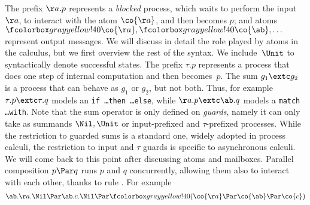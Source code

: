 The prefix $ \aa.p $ represents a {\em blocked} process, which waits
to perform the
input $\aa$, \ie to interact with the atom $\co{ \aa}$, and then becomes $p$; and atoms
$\mailbox{\co{ \aa }}, \mailbox{\co{ \ab }}, \ldots$ represent output
messages.  We will discuss in detail the role played by atoms in the
calculus, but we first overview the rest of the syntax. We
include~$\Unit$ to syntactically denote successful states.
The prefix $ \tau.p $ represents a process that does one step of
  internal computation and then becomes~$p$.
  The sum $g_1 \extc g_2$ is a process that can behave as $g_1$ or $g_2$, but not both.
  Thus, for example $ \tau.p \extc \tau.q$ models an \texttt{if \ldots then \ldots else}, while
$ \aa.p \extc \ab.q$ models a \texttt{match \ldots with}.
Note that the sum operator is only defined on \emph{guards}, namely it can only
take as summands $\Nil, \Unit$ 
  or input-prefixed and $\tau$-prefixed
processes.
While the restriction to guarded sums is a standard one,
widely adopted in process calculi,
the restriction to input and $\tau$ guards is specific to asynchronous
calculi. We will come back to this point after discussing atoms and
mailboxes.
%
Parallel composition $p \Par q$ runs $p$ and $q$ concurrently,
allowing them also to interact with each other, thanks to rule \com. For example
\begin{equation}
  \label{eq:example1}
  \ab.\aa.\Nil \Par \ab.c.\Nil \Par \mailbox{ ( \co{\aa} \Par \co{\ab} \Par \co{c} ) }
\end{equation}
